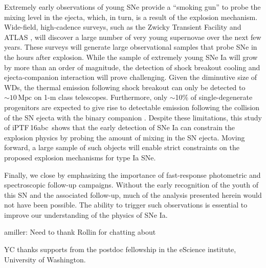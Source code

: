 \documentclass[twocolumn]{aastex61}
\newcommand{\abc}{iPTF\,16abc}
\newcommand{\amiller}[1]{{\color{blue} amiller: {#1}}}
\begin{document}
Extremely early observations of young SNe provide a ``smoking
gun'' to probe the mixing level in the ejecta, which, in turn, is 
a result of the explosion mechanism. Wide-field, high-cadence surveys, such as the Zwicky Transient Facility \citep{2016PASP..128h4501B} and ATLAS \citep{2011PASP..123...58T,2013RSPTA.37120269T}, will discover a large number of very young supernovae over the next few years. These surveys will generate large observational samples that probe SNe in the hours after explosion. While the sample of extremely young SNe Ia will grow by more than an order of magnitude, the detection of shock breakout cooling and ejecta-companion interaction will prove challenging. Given the diminutive size of WDs, the thermal emission following shock breakout can only be detected to $\sim 10\,\mathrm{Mpc}$ on 1-m class telescopes. Furthermore, only $\sim$10\% of single-degenerate progenitors are expected to give rise to detectable emission following the collision of the SN ejecta with the binary companion \citep{2010ApJ...708.1025K}. Despite these limitations, this study of \abc\ shows that the early detection of SNe Ia can constrain the explosion physics by probing the amount of mixing in the SN ejecta. Moving forward, a large sample of such objects will enable strict constraints on the proposed explosion mechanisms for type Ia SNe.

Finally, we close by emphasizing the importance of fast-response photometric and spectroscopic follow-up campaigns. Without the early recognition of the youth of this SN and the associated follow-up, much of the analysis presented herein would not have been possible. The ability to trigger such observations is essential to improve our understanding of the physics of SNe Ia.

\acknowledgements

\amiller{Need to thank Rollin for chatting about }

YC thanks supports from the postdoc fellowship in the eScience
institute, University of Washington.





\end{document}

